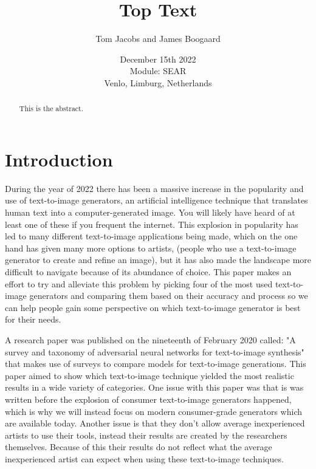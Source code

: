 \documentclass[]{report}
\title{Top Text}
\author{Tom Jacobs and James Boogaard}
\date{December 15th 2022 \\Module: SEAR \\Venlo, Limburg, Netherlands}
\begin{document}
	
	\maketitle
	
	\begin{abstract}
		This is the abstract.
		
		
	\end{abstract}
	
	\tableofcontents
	\setcounter{page}{3}
	\listoffigures %
	\pagebreak
	
	
	\section{Introduction}
During the year of 2022 there has been a massive increase in the popularity and use of text-to-image generators, an artificial intelligence technique that translates human text into a computer-generated image. You will likely have heard of at least one of these if you frequent the internet. This explosion in popularity has led to many different text-to-image applications being made, which on the one hand has given many more options to artists, (people who use a text-to-image generator to create and refine an image), but it has also made the landscape more difficult to navigate because of its abundance of choice. This paper makes an effort to try and alleviate this problem by picking four of the most used text-to-image generators and comparing them based on their accuracy and process so we can help people gain some perspective on which text-to-image generator is best for their needs.

A research paper was published on the nineteenth of February 2020 called: "A survey and taxonomy of adversarial neural networks for text-to-image synthesis" that makes use of surveys to compare models for text-to-image generations. This paper aimed to show which text-to-image technique yielded the most realistic results in a wide variety of categories. One issue with this paper was that is was written before the explosion of consumer text-to-image generators happened, which is why we will instead focus on modern consumer-grade generators which are available today. Another issue is that they don't allow average inexperienced artists to use their tools, instead their results are created by the researchers themselves. Because of this their results do not reflect what the average inexperienced artist can expect when using these text-to-image techniques. 
\end{document}
